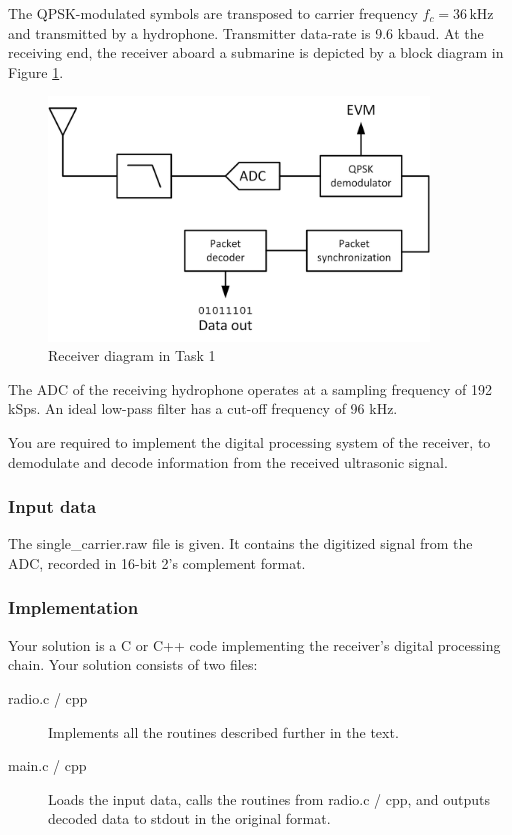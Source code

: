 \documentclass[openany]{book}
\begin{document}
	The QPSK-modulated symbols are transposed to carrier frequency $f_c = 36 
	\,\textrm{kHz}$ and transmitted by a hydrophone. Transmitter data-rate is 
	9.6 kbaud. At the receiving end, the receiver aboard a submarine is 
	depicted by a block diagram in Figure \ref{fig:task1}.
	
	\begin{figure}[h!]
		\centering
		\includegraphics[width=0.9\textwidth]{Images/Task1.png}
		\caption{Receiver diagram in Task 1}
		\label{fig:task1}
	\end{figure}
	
	The ADC of the receiving hydrophone operates at a sampling frequency of 192 
	kSps. An ideal low-pass filter has a cut-off frequency of 96 kHz.
	
	You are required to implement the digital processing system of the 
	receiver, to demodulate and decode information from the received ultrasonic 
	signal.
	
	\subsubsection{Input data}
	The \textsf{single\_carrier.raw} file is given. It contains the digitized 
	signal from the ADC, recorded in 16-bit 2's complement format.
	
	\subsubsection{Implementation}
	Your solution is a C or C++ code implementing the receiver's digital 
	processing chain. Your solution consists of two files:
	\begin{description}
		\item[radio.c / cpp] Implements all the routines described further in 
		the text.
		\item[main.c / cpp] Loads the input data, calls the routines from 
		\textsf{radio.c / cpp}, and outputs decoded data to stdout in the 
		original format.
	\end{description}
	
\end{document}
